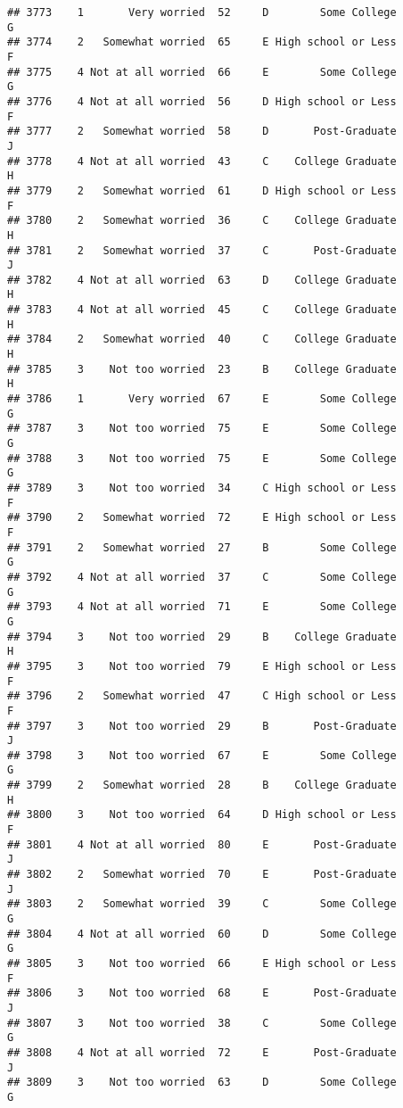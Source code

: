 \documentclass[
]{article}
\begin{document}
\begin{verbatim}
## 3773    1       Very worried  52     D        Some College         G
## 3774    2   Somewhat worried  65     E High school or Less         F
## 3775    4 Not at all worried  66     E        Some College         G
## 3776    4 Not at all worried  56     D High school or Less         F
## 3777    2   Somewhat worried  58     D       Post-Graduate         J
## 3778    4 Not at all worried  43     C    College Graduate         H
## 3779    2   Somewhat worried  61     D High school or Less         F
## 3780    2   Somewhat worried  36     C    College Graduate         H
## 3781    2   Somewhat worried  37     C       Post-Graduate         J
## 3782    4 Not at all worried  63     D    College Graduate         H
## 3783    4 Not at all worried  45     C    College Graduate         H
## 3784    2   Somewhat worried  40     C    College Graduate         H
## 3785    3    Not too worried  23     B    College Graduate         H
## 3786    1       Very worried  67     E        Some College         G
## 3787    3    Not too worried  75     E        Some College         G
## 3788    3    Not too worried  75     E        Some College         G
## 3789    3    Not too worried  34     C High school or Less         F
## 3790    2   Somewhat worried  72     E High school or Less         F
## 3791    2   Somewhat worried  27     B        Some College         G
## 3792    4 Not at all worried  37     C        Some College         G
## 3793    4 Not at all worried  71     E        Some College         G
## 3794    3    Not too worried  29     B    College Graduate         H
## 3795    3    Not too worried  79     E High school or Less         F
## 3796    2   Somewhat worried  47     C High school or Less         F
## 3797    3    Not too worried  29     B       Post-Graduate         J
## 3798    3    Not too worried  67     E        Some College         G
## 3799    2   Somewhat worried  28     B    College Graduate         H
## 3800    3    Not too worried  64     D High school or Less         F
## 3801    4 Not at all worried  80     E       Post-Graduate         J
## 3802    2   Somewhat worried  70     E       Post-Graduate         J
## 3803    2   Somewhat worried  39     C        Some College         G
## 3804    4 Not at all worried  60     D        Some College         G
## 3805    3    Not too worried  66     E High school or Less         F
## 3806    3    Not too worried  68     E       Post-Graduate         J
## 3807    3    Not too worried  38     C        Some College         G
## 3808    4 Not at all worried  72     E       Post-Graduate         J
## 3809    3    Not too worried  63     D        Some College         G

\end{verbatim}
\end{document}
